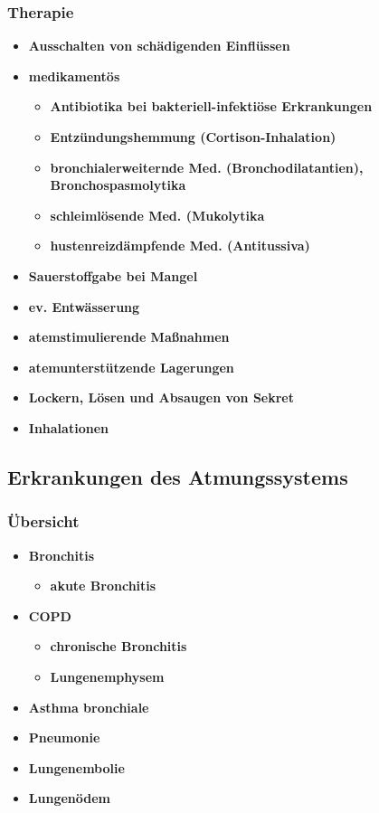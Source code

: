 \begin{itemize}
	\subsubsection{Therapie}
		\begin{itemize}
			\item \textbf{Ausschalten von schädigenden Einflüssen}
			\item \textbf{medikamentös}
				\begin{itemize}
					\item \textbf{Antibiotika bei bakteriell-infektiöse Erkrankungen}
					\item \textbf{Entzündungshemmung (Cortison-Inhalation)}
					\item \textbf{bronchialerweiternde Med. (Bronchodilatantien), Bronchospasmolytika}
					\item \textbf{schleimlösende Med. (Mukolytika}
					\item \textbf{hustenreizdämpfende Med. (Antitussiva)}
				\end{itemize}
			\item \textbf{Sauerstoffgabe bei Mangel}
			\item \textbf{ev. Entwässerung}
			\item \textbf{atemstimulierende Maßnahmen}
			\item \textbf{atemunterstützende Lagerungen}
			\item \textbf{Lockern, Lösen und Absaugen von Sekret}
			\item \textbf{Inhalationen}
		\end{itemize}
		
\subsection{Erkrankungen des Atmungssystems}
	\subsubsection{Übersicht}
		\begin{itemize}
			\item \textbf{Bronchitis}
				\begin{itemize}
					\item \textbf{akute Bronchitis}
				\end{itemize}
			\item \textbf{COPD}
				\begin{itemize}
					\item \textbf{chronische Bronchitis}
					\item \textbf{Lungenemphysem}
				\end{itemize}
			\item \textbf{Asthma bronchiale}
			\item \textbf{Pneumonie}
			\item \textbf{Lungenembolie}
			\item \textbf{Lungenödem}
		\end{itemize}

\end{itemize}
